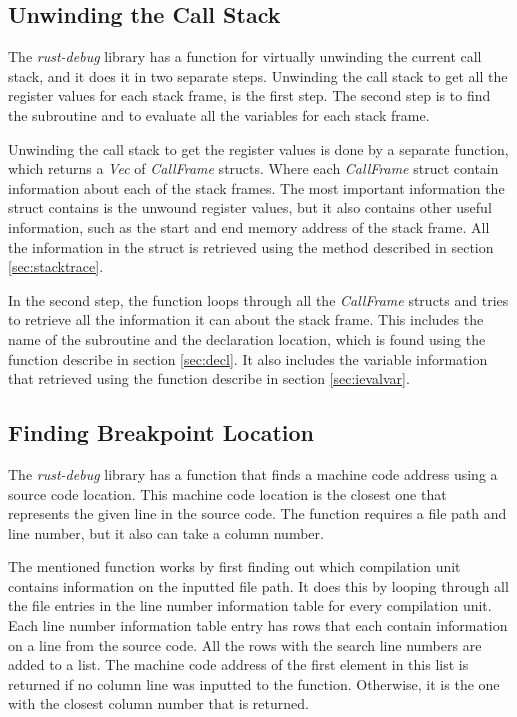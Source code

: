 \subsection{Unwinding the Call Stack}

The \emph{rust-debug} library has a function for virtually unwinding the current call stack, and it does it in two separate steps.
Unwinding the call stack to get all the register values for each stack frame, is the first step.
The second step is to find the subroutine and to evaluate all the variables for each stack frame.


Unwinding the call stack to get the register values is done by a separate function, which returns a \emph{Vec} of \emph{CallFrame} structs.
Where each \emph{CallFrame} struct contain information about each of the stack frames.
The most important information the struct contains is the unwound register values, but it also contains other useful information, such as the start and end memory address of the stack frame.
All the information in the struct is retrieved using the method described in section \ref{sec:stacktrace}.


In the second step, the function loops through all the \emph{CallFrame} structs and tries to retrieve all the information it can about the stack frame.
This includes the name of the subroutine and the declaration location, which is found using the function describe in section \ref{sec:decl}.
It also includes the variable information that retrieved using the function describe in section \ref{sec:ievalvar}.



\subsection{Finding Breakpoint Location}
The \emph{rust-debug} library has a function that finds a machine code address using a source code location.
This machine code location is the closest one that represents the given line in the source code.
The function requires a file path and line number, but it also can take a column number.


The mentioned function works by first finding out which compilation unit contains information on the inputted file path.
It does this by looping through all the file entries in the line number information table for every compilation unit.
Each line number information table entry has rows that each contain information on a line from the source code.
All the rows with the search line numbers are added to a list.
The machine code address of the first element in this list is returned if no column line was inputted to the function.
Otherwise, it is the one with the closest column number that is returned.




